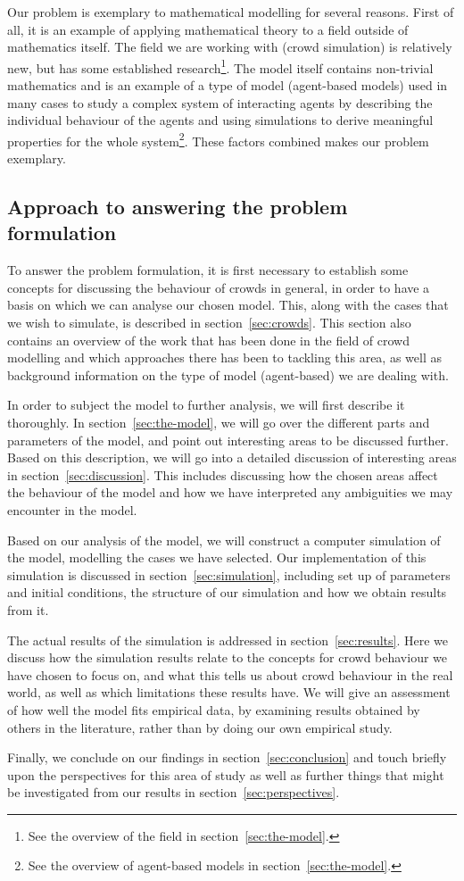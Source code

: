 Our problem is exemplary to mathematical modelling for several reasons. First 
of all, it is an example of applying mathematical theory to a field outside of 
mathematics itself. The field we are working with (crowd simulation) is 
relatively new, but has some established research\footnote{See the overview of 
the field in section~\ref{sec:the-model}.}. The model itself contains 
non-trivial mathematics and is an example of a type of model (agent-based 
models) used in many cases to study a complex system of interacting agents by 
describing the individual behaviour of the agents and using simulations to 
derive meaningful properties for the whole system\footnote{See the overview of 
agent-based models in section~\ref{sec:the-model}.}. These factors combined 
makes our problem exemplary.

\subsection{Approach to answering the problem formulation}
To answer the problem formulation, it is first necessary to establish some 
concepts for discussing the behaviour of crowds in general, in order to have a 
basis on which we can analyse our chosen model. This, along with the cases 
that we wish to simulate, is described in section~\ref{sec:crowds}. This 
section also contains an overview of the work that has been done in the field 
of crowd modelling and which approaches there has been to tackling this area, 
as well as background information on the type of model (agent-based) we are 
dealing with.

In order to subject the model to further analysis, we will first describe it 
thoroughly. In section~\ref{sec:the-model}, we will go over the different 
parts and parameters of the model, and point out interesting areas to be 
discussed further.  Based on this description, we will go into a detailed 
discussion of interesting areas in section~\ref{sec:discussion}.  This 
includes discussing how the chosen areas affect the behaviour of the model and 
how we have interpreted any ambiguities we may encounter in the model.

Based on our analysis of the model, we will construct a computer simulation of 
the model, modelling the cases we have selected. Our implementation of this 
simulation is discussed in section~\ref{sec:simulation}, including set up of 
parameters and initial conditions, the structure of our simulation and how we 
obtain results from it.

The actual results of the simulation is addressed in 
section~\ref{sec:results}. Here we discuss how the simulation results relate 
to the concepts for crowd behaviour we have chosen to focus on, and what this 
tells us about crowd behaviour in the real world, as well as which limitations 
these results have.  We will give an assessment of how well the model fits 
empirical data, by examining results obtained by others in the literature, 
rather than by doing our own empirical study.

Finally, we conclude on our findings in section~\ref{sec:conclusion} and touch 
briefly upon the perspectives for this area of study as well as further things 
that might be investigated from our results in section~\ref{sec:perspectives}.
